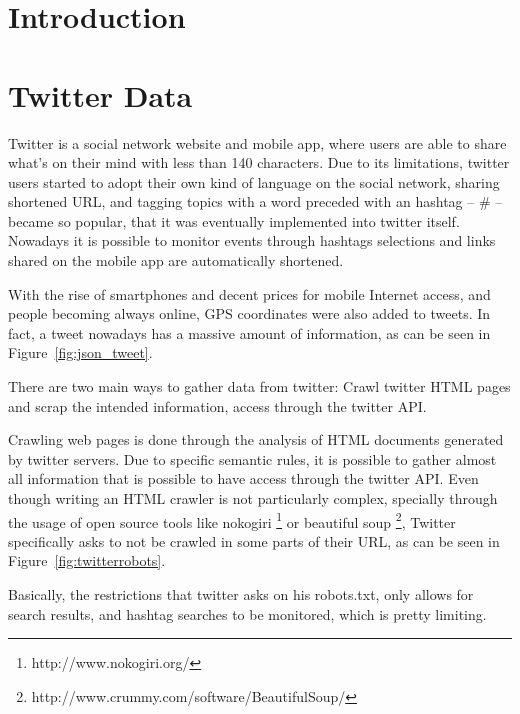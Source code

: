 \label{ch:clustering_tweets}

\section{Introduction}
\label{sec:adapting_the_som_to_the_social_web}

\section{Twitter Data}
\label{sec:crawling_twitter}
Twitter is a social network website and mobile app, where users are able to share what's on their mind with less than 140 characters. Due to its limitations, twitter users started to adopt their own kind of language on the social network, sharing shortened \ac{URL}, and tagging topics with a word preceded with an hashtag -- \# -- became so popular, that it was eventually implemented into twitter itself. Nowadays it is possible to monitor events through hashtags selections and links shared on the mobile app are automatically shortened.   

With the rise of smartphones and decent prices for mobile Internet access, and people becoming always online, GPS coordinates were also added to tweets. In fact, a tweet nowadays has a massive amount of information, as can be seen in Figure~\ref{fig:json_tweet}.


There are two main ways to gather data from twitter: Crawl twitter HTML pages and scrap the intended information, access through the twitter API.

Crawling web pages is done through the analysis of HTML documents generated by twitter servers. Due to specific semantic rules, it is possible to gather almost all information that is possible to have access through the twitter API. Even though writing an HTML crawler is not particularly complex, specially through the usage of open source tools like nokogiri \footnote{http://www.nokogiri.org/} or beautiful soup \footnote{http://www.crummy.com/software/BeautifulSoup/}, Twitter specifically asks to not be crawled in some parts of their \ac{URL}, as can be seen in Figure~\ref{fig:twitterrobots}. 

Basically, the restrictions that twitter asks on his robots.txt, only allows for search results, and hashtag searches to be monitored, which is pretty limiting.


